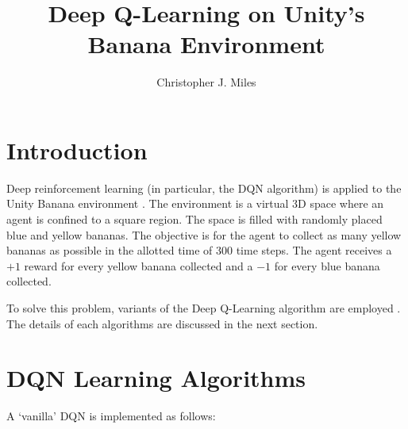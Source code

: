 \documentclass[12]{article}
\begin{document}
\title{Deep Q-Learning on Unity's Banana Environment}
\author{Christopher J. Miles}
\maketitle





\section{Introduction}

Deep reinforcement learning (in particular, the DQN algorithm) is applied to the Unity Banana environment \cite{unity}.  The environment is a virtual 3D space where an agent is confined to a square region. The space is filled with randomly placed blue and yellow bananas. The objective is for the agent to collect as many yellow bananas as possible in the allotted time of 300 time steps. The agent receives a $+1$ reward for every yellow banana collected and a $-1$ for every blue banana collected. 

To solve this problem, variants of the Deep Q-Learning algorithm are employed \cite{Wang2016,Schaul2016,Mnih2015}. The details of each algorithms are discussed in the next section.

\section{DQN Learning Algorithms}

A `vanilla' DQN \cite{Mnih2015, Udacity2018} is implemented as follows:

\
\end{document}
